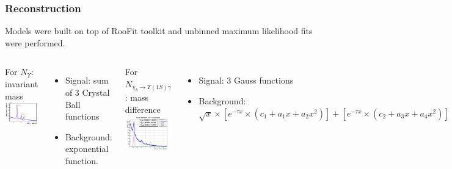 \documentclass{beamer}
\begin{document}
\begin{frame}[t]
\frametitle{Reconstruction}
Models were built on top of RooFit toolkit and unbinned maximum likelihood fits were performed.
\begin{columns}[t]
For $N_{\Upsilon}$:
invariant mass
\includegraphics[height=.35\textheight]{images/ups.png}\\~\\
\begin{itemize}
  \item Signal: sum of 3 Crystal Ball functions
  \item Background: exponential function.
\end{itemize}
For $N_{\chi_{b} \rightarrow \Upsilon(1S) \gamma}$: mass difference
\includegraphics[height=.3\textheight]{images/fit.png}
\begin{itemize}
  \item Signal: 3 Gauss functions
  \item Background: $\sqrt{x} \times \left[e^{- \tau x} \times (c_1+a_1x+a_2x^2)\right] + \left[e^{-\tau x} \times (c_2+a_3x+a_4x^2)\right]$
\end{itemize}
(not enough resolution to separate $\chi_{b(0,1,2)}$)
\end{columns}
\end{frame}
\end{document}
